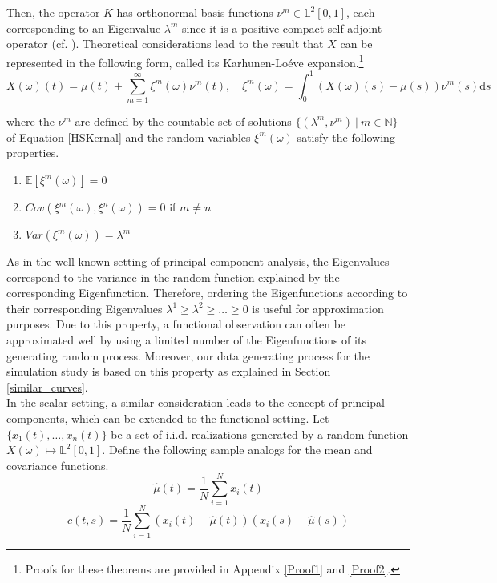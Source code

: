 \documentclass[11pt,twoside,a4paper]{article}
\begin{document}
	Then, the operator $K$ has orthonormal basis functions $\nu^{m} \in \mathbb{L}^{2}[0,1]$, each corresponding to an Eigenvalue $\lambda^{m}$ since it is a positive compact self-adjoint operator (cf. \cite{alexanderian_KLexpansion_2015}).
	Theoretical considerations lead to the result that $X$ can be represented in the following form, called its Karhunen-Lo\'{e}ve expansion.\footnote{Proofs for these theorems are provided in Appendix \ref{Proof1} and \ref{Proof2}.} 
	\begin{equation}\label{KarhunenLoeve}
		X(\omega)(t) = \mu(t) + \sum_{m = 1}^{\infty} \xi^m(\omega) \nu^m(t), \quad \xi^m(\omega) =  \int_{0}^{1} \left(X(\omega)(s) - \mu(s)\right) \nu^m(s) \mathrm{d}s
	\end{equation}

	where the $\nu^m$ are defined by the countable set of solutions $\{(\lambda^m, \nu^m) \: \vert \: m \in \mathbb{N}\}$ of Equation \ref{HSKernal} and the random variables $\xi^{m}(\omega)$ satisfy the following properties.
	\begin{multicols}{2}
		\begin{enumerate}
			\item $\mathbb{E}\left[\xi^m(\omega)\right] = 0$
			\item $Cov\left(\xi^m(\omega), \xi^n(\omega)\right) = 0$ if $m \neq n$
			\item $Var\left(\xi^m(\omega)\right) = \lambda^m$
		\end{enumerate}
	\end{multicols}

	As in the well-known setting of principal component analysis, the Eigenvalues correspond to the variance in the random function explained by the corresponding Eigenfunction. 
	Therefore, ordering the Eigenfunctions according to their corresponding Eigenvalues $\lambda^{1} \geq \lambda^{2} \geq \dots \geq 0$ is useful for approximation purposes. Due to this property, a functional observation can often be approximated well by using a limited number of the Eigenfunctions of its generating random process. Moreover, our data generating process for the simulation study is based on this property as explained in Section \ref{similar_curves}.\\
	In the scalar setting, a similar consideration leads to the concept of principal components, which can be extended to the functional setting. Let $\{x_1(t), \dots, x_n(t)\}$ be a set of i.i.d. realizations generated by a random function $X(\omega) \mapsto \mathbb{L}^2[0,1]$.
	Define the following sample analogs for the mean and covariance functions.
	\begin{equation}
		\hat{\mu}(t) = \frac{1}{N}\sum_{i = 1}^{N}x_i(t)
	\end{equation}
	\begin{equation}
		\hat{c}(t,s) = \frac{1}{N} \sum_{i = 1}^{N} \left(x_i(t) - \hat{\mu}(t)\right) \left(x_i(s) - \hat{\mu}(s)\right)
	\end{equation}
	
\end{document}
